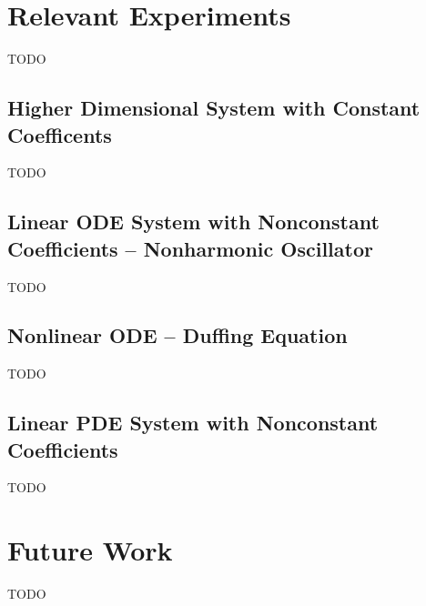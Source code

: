\documentclass[accepted]{uai2023}
\newcommand{\I}{\mathcal{I}}
\begin{document}
\section{Relevant Experiments}\label{section:experiments}
    TODO

\subsection{Higher Dimensional System with Constant Coefficents} \label{section:high-dimension}
    TODO

\subsection{Linear ODE System with Nonconstant Coefficients -- Nonharmonic Oscillator} \label{section:experiment-nonharmonic-oscillator}
    TODO

\subsection{Nonlinear ODE -- Duffing Equation} \label{section:experiment-duffing}
    TODO

\subsection{Linear PDE System with Nonconstant Coefficients } \label{section:experiment-attractor}
    TODO

\section{Future Work}
    TODO


\appendix


\end{document}
